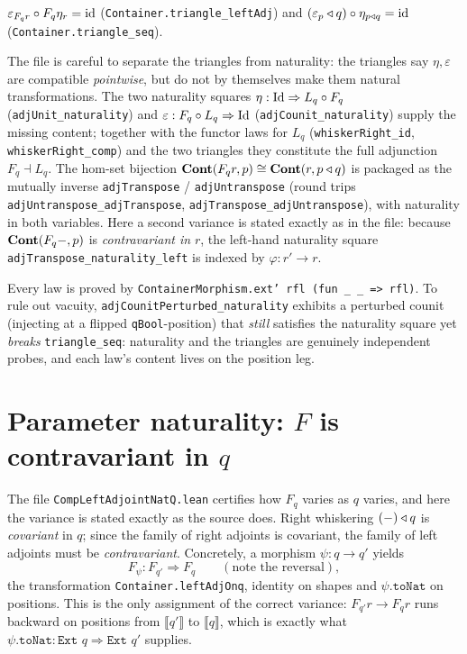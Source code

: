 \begin{theorem}
\label{thm:leancob-triangles}
$\varepsilon_{F_q r}\circ F_q\eta_r = \mathrm{id}$ (\texttt{Container.triangle\_leftAdj}) and $(\varepsilon_p\triangleleft q)\circ\eta_{p\triangleleft q}=\mathrm{id}$ (\texttt{Container.triangle\_seq}).
\end{theorem}

The file is careful to separate the triangles from naturality: the triangles say $\eta,\varepsilon$ are compatible \emph{pointwise}, but do not by themselves make them natural transformations. The two naturality squares $\eta:\mathrm{Id}\Rightarrow L_q\circ F_q$ (\texttt{adjUnit\_naturality}) and $\varepsilon:F_q\circ L_q\Rightarrow\mathrm{Id}$ (\texttt{adjCounit\_naturality}) supply the missing content; together with the functor laws for $L_q$ (\texttt{whiskerRight\_id}, \texttt{whiskerRight\_comp}) and the two triangles they constitute the full adjunction $F_q\dashv L_q$. The hom-set bijection $\mathbf{Cont}(F_q r,p)\cong\mathbf{Cont}(r,p\triangleleft q)$ is packaged as the mutually inverse \texttt{adjTranspose} / \texttt{adjUntranspose} (round trips \texttt{adjUntranspose\_adjTranspose}, \texttt{adjTranspose\_adjUntranspose}), with naturality in both variables. Here a second variance is stated exactly as in the file: because $\mathbf{Cont}(F_q -,p)$ is \emph{contravariant in} $r$, the left-hand naturality square \texttt{adjTranspose\_naturality\_left} is indexed by $\varphi:r'\to r$.

\begin{remark}
Every law is proved by \texttt{ContainerMorphism.ext' rfl (fun \_ \_ => rfl)}. To rule out vacuity, \texttt{adjCounitPerturbed\_naturality} exhibits a perturbed counit (injecting at a flipped \texttt{qBool}-position) that \emph{still} satisfies the naturality square yet \emph{breaks} \texttt{triangle\_seq}: naturality and the triangles are genuinely independent probes, and each law's content lives on the position leg.
\end{remark}

\section{Parameter naturality: $F$ is contravariant in $q$}
\label{sec:leancob-natq}

The file \texttt{CompLeftAdjointNatQ.lean} certifies how $F_q$ varies as $q$ varies, and here the variance is stated exactly as the source does. Right whiskering $(-)\triangleleft q$ is \emph{covariant} in $q$; since the family of right adjoints is covariant, the family of left adjoints must be \emph{contravariant}. Concretely, a morphism $\psi:q\to q'$ yields
\[
  F_\psi : F_{q'}\Rightarrow F_q \qquad(\text{note the reversal}),
\]
the transformation \texttt{Container.leftAdjOnq}, identity on shapes and $\psi.\texttt{toNat}$ on positions. This is the only assignment of the correct variance: $F_{q'}r\to F_q r$ runs backward on positions from $\llbracket q'\rrbracket$ to $\llbracket q\rrbracket$, which is exactly what $\psi.\texttt{toNat}:\texttt{Ext } q\Rightarrow\texttt{Ext } q'$ supplies.

